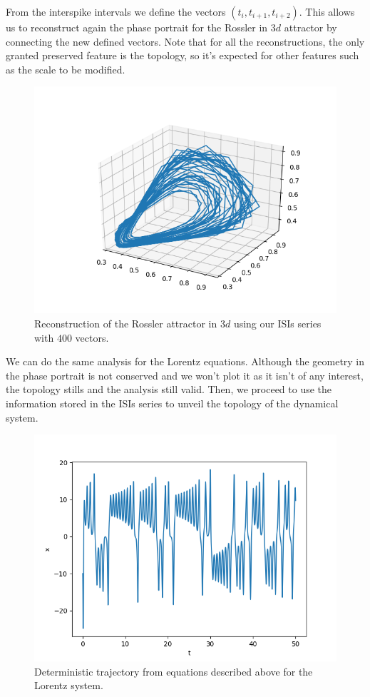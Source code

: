\documentclass[10pt]{article}
\begin{document}
From the interspike intervals we define the vectors $(t_i,t_{i+1},t_{i+2})$. This allows us to reconstruct again the phase portrait for the Rossler in $3d$ attractor by connecting the new defined vectors. Note that for all the reconstructions, the only granted preserved feature is the topology, so it's expected for other features such as the scale to be modified.

\begin{figure}[h!]
\centering
\includegraphics[scale=0.45]{rossler_atractor_400points}
\caption{Reconstruction of the Rossler attractor in $3d$ using our ISIs series with $400$ vectors.}
\label{fig:rossler_isi}
\end{figure}

We can do the same analysis for the Lorentz equations. Although the geometry in the phase portrait is not conserved and we won't plot it as it isn't of any interest, the topology stills and the analysis still valid. Then, we proceed to use the information stored in the ISIs series to unveil the topology of the dynamical system.

\begin{figure}[h!]
\centering
\includegraphics[scale=0.5]{real_trajectory_lorentz}
\caption{Deterministic trajectory from equations described above for the Lorentz system.}
\label{fig:lorentz_trajectory}
\end{figure}
\end{document}
